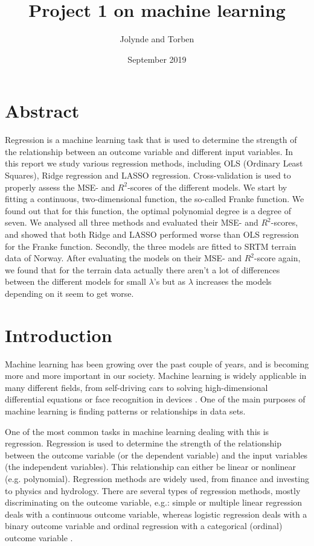 \documentclass[12pt]{extarticle}
\title{Project 1 on machine learning}
\author{Jolynde and Torben}
\date{September 2019}
\begin{document}
\maketitle
\clearpage
\tableofcontents
\clearpage

\section{Abstract}

Regression is a machine learning task that is used to determine the strength of the relationship between an outcome variable and different input variables. In this report we study various regression methods, including OLS (Ordinary Least Squares), Ridge regression and LASSO regression. Cross-validation is used to properly assess the MSE- and $R^2$-scores of the different models. We start by fitting a continuous, two-dimensional function, the so-called Franke function. We found out that for this function, the optimal polynomial degree is a degree of seven. We analysed all three methods and evaluated their MSE- and $R^2$-scores, and showed that both Ridge and LASSO performed worse than OLS regression for the Franke function. Secondly, the three models are fitted to SRTM terrain data of Norway. After evaluating the models on their MSE- and $R^2$-score again, we found that for the terrain data actually there aren't a lot of differences between the different models for small $\lambda$'s but as $\lambda$ increases the models depending on it seem to get worse.

\section{Introduction}

Machine learning has been growing over the past couple of years, and is becoming more and more important in our society. Machine learning is widely applicable in many different fields, from self-driving cars to solving high-dimensional differential equations or face recognition in devices \cite{lec}. One of the main purposes of machine learning is finding patterns or relationships in data sets. 

One of the most common tasks in machine learning dealing with this is regression. Regression is used to determine the strength of the relationship between the outcome variable (or the dependent variable) and the input variables (the independent variables). This relationship can either be linear or nonlinear (e.g. polynomial). Regression methods are widely used, from finance and investing to physics and hydrology. There are several types of regression methods, mostly discriminating on the outcome variable, e.g.: simple or multiple linear regression deals with a continuous outcome variable, whereas logistic regression deals with a binary outcome variable and ordinal regression with a categorical (ordinal) outcome variable \cite{ss}. 
\end{document}
